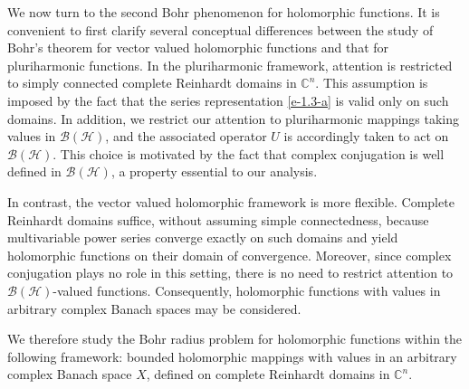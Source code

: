 \documentclass[a4paper,11pt, reqno]{amsart}
\theoremstyle{definition}
\begin{document}
We now turn to the second Bohr phenomenon for holomorphic functions. It is convenient to first clarify several conceptual differences between the study of Bohr’s theorem for vector valued holomorphic functions and that for pluriharmonic functions. In the pluriharmonic framework, attention is restricted to simply connected complete Reinhardt domains in $\mathbb{C}^n$. This assumption is imposed by the fact that the series representation \eqref{e-1.3-a} is valid only on such domains. In addition, we restrict our attention to pluriharmonic mappings taking values in $\mathcal{B}(\mathcal{H})$, and the associated operator $U$ is accordingly taken to act on $\mathcal{B}(\mathcal{H})$. This choice is motivated by the fact that complex conjugation is well defined in $\mathcal{B}(\mathcal{H})$, a property essential to our analysis. 
\vspace{1mm}

In contrast, the vector valued holomorphic framework is more flexible. Complete Reinhardt domains suffice, without assuming simple connectedness, because multivariable power series converge exactly on such domains and yield holomorphic functions on their domain of convergence. Moreover, since complex conjugation plays no role in this setting, there is no need to restrict attention to $\mathcal{B}(\mathcal{H})$-valued functions. Consequently, holomorphic functions with values in arbitrary complex Banach spaces may be considered.
\vspace{1mm}

We therefore study the Bohr radius problem for holomorphic functions within the following framework: bounded holomorphic mappings with values in an arbitrary complex Banach space $X$, defined on complete Reinhardt domains in $\mathbb{C}^n$. 
\vspace{1mm}
\end{document}
